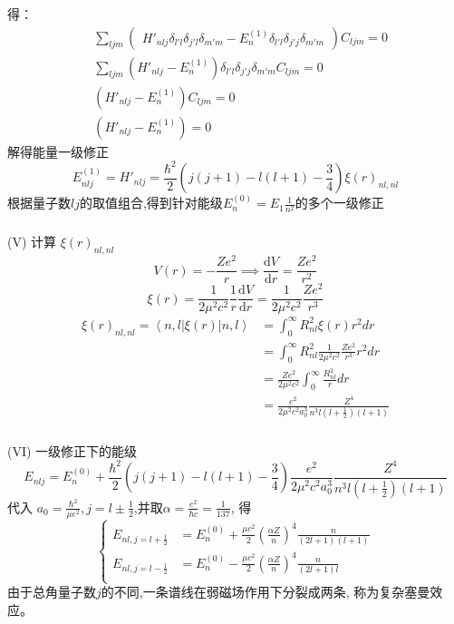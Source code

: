 \begin{frame}[label=current]
  \frametitle{}
得：
\begin{equation*}
  \begin{aligned}
    & \sum_{ljm}\begin{pmatrix}H'_{nlj} \delta _{l'l} \delta _{j'l}\delta _{m'm} -E^{(1)}_n \delta _{l'l} \delta _{j'j}\delta _{m'm} \end{pmatrix}C_{ljm} =0 \\ 
    & \sum_{ljm}(H'_{nlj} -E^{(1)}_n) \delta _{l'l} \delta _{j'j}\delta _{m'm} C_{ljm} =0 \\
    & (H'_{nlj} -E^{(1)}_n)C_{ljm} =0 \\
    & (H'_{nlj} -E^{(1)}_n) =0
  \end{aligned}
\end{equation*}
解得能量一级修正
\[E^{(1)}_{nlj} = H'_{nlj} = \frac{\hbar^2}{2} (j(j+1) - l(l+1) - \frac{3}{4}) \xi(r)_{nl, nl} \]
根据量子数$lj$的取值组合,得到针对能级$E^{(0)}_n = E_1 \frac{1}{n^2}$的多个一级修正
\end{frame} 

\begin{frame}[label=current]
  \frametitle{}
  (V) 计算 $\xi(r)_{nl, nl} $\\
  $$V(r) = - \frac{Ze^2}{r}  \implies \frac{\mathrm{d}V}{\mathrm{d} r} = \frac{Ze^2}{r^2} $$ 
  $$\xi(r) = \frac{1}{2\mu ^2 c^2} \frac{1}{r} \frac{\mathrm{d}V}{\mathrm{d} r} = \frac{1}{2\mu ^2 c^2} \frac{Ze^2}{r^3}$$
  \begin{equation*}
    \begin{aligned}
      \xi(r)_{nl, nl} = \left\langle n, l \right\vert  \xi(r) \left\vert n, l \right\rangle 
      &= \int_0^\infty R^2 _{nl}  \xi(r) r^2 dr \\
      &=  \int_0^\infty R^2 _{nl} \frac{1}{2\mu ^2 c^2} \frac{Ze^2}{r^3} r^2 dr \\
      &= \frac{Ze^2}{2\mu ^2 c^2} \int_0^\infty \frac{R^2 _{nl}}{r}  dr \\
      &= \frac{e^2}{2\mu ^2 c^2 a^3 _0} \frac{Z^4}{n^3l(l+\frac{1}{2})(l+1)}
    \end{aligned}
  \end{equation*}
\end{frame} 

\begin{frame}[label=current]
  \frametitle{}
  (VI) 一级修正下的能级
  \[ E_{nlj} = E^{(0)}_{n} + \frac{\hbar^2}{2} (j(j+1) - l(l+1) - \frac{3}{4}) \frac{e^2}{2\mu ^2 c^2 a^3 _0} \frac{Z^4}{n^3l(l+\frac{1}{2})(l+1)}  \]
代入 $a_0 = \frac{\hbar^2}{\mu e^2}, j = l \pm \frac{1}{2}$,并取$\alpha = \frac{e^2}{\hbar c} =\frac{1}{137}$, 得
\[ \left\{\begin{aligned}
  E_{nl,j=l+\frac{1}{2}} &= E^{(0)}_{n} + \frac{\mu c^2}{2}( \frac{\alpha Z}{n})^4 \frac{n}{(2l+1)(l+1)} \\ 
  E_{nl,j=l-\frac{1}{2}} &= E^{(0)}_{n} - \frac{\mu c^2}{2}( \frac{\alpha Z}{n})^4 \frac{n}{(2l+1)l} \\
\end{aligned}\right. \] 
由于总角量子数$j$的不同,一条谱线在弱磁场作用下分裂成两条, 称为复杂塞曼效应。
\end{frame} 

